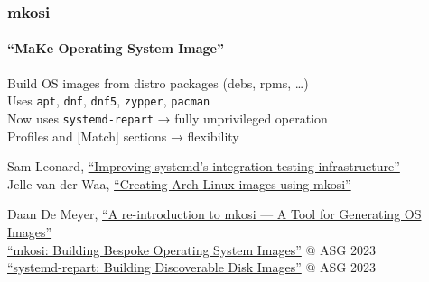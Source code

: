\documentclass[]{beamer}
\newcommand\pp{}
\begin{document}
\begin{frame}
  \frametitle{mkosi}
  \framesubtitle{``\textbf{M}a\textbf{K}e \textbf{O}perating \textbf{S}ystem \textbf{I}mage''}

  Build OS images from distro packages (debs, rpms, …)
  \\

  \pp
  Uses \texttt{apt}, \texttt{dnf}, \texttt{dnf5}, \texttt{zypper}, \texttt{pacman}
  \\

  \pp
  Now uses \texttt{systemd-repart} → fully unprivileged operation
  \\

  \pp
  Profiles and [Match] sections → flexibility
  \\
  
  \small
  \pp
  Sam Leonard,
  \href{https://cfp.all-systems-go.io/all-systems-go-2024/talk/9JKWCT/}
       {``Improving systemd’s integration testing infrastructure''}
  \\\quad
  Jelle van der Waa,
  \href{https://cfp.all-systems-go.io/all-systems-go-2024/talk/QFUGLT/}
      {``Creating Arch Linux images using mkosi''}

  \pp

  Daan De Meyer,
  \href{https://0pointer.net/blog/a-re-introduction-to-mkosi-a-tool-for-generating-os-images.html}
       {``A re-introduction to mkosi --- A Tool for Generating OS Images''}\\
  \href{https://media.ccc.de/v/all-systems-go-2023-190-mkosi-building-bespoke-operating-system-images}
       {``mkosi: Building Bespoke Operating System Images''} @ ASG 2023\\
  \href{https://media.ccc.de/v/all-systems-go-2023-191-systemd-repart-building-discoverable-disk-images}
       {``systemd-repart: Building Discoverable Disk Images''} @ ASG 2023\\

\end{frame}
\end{document}
